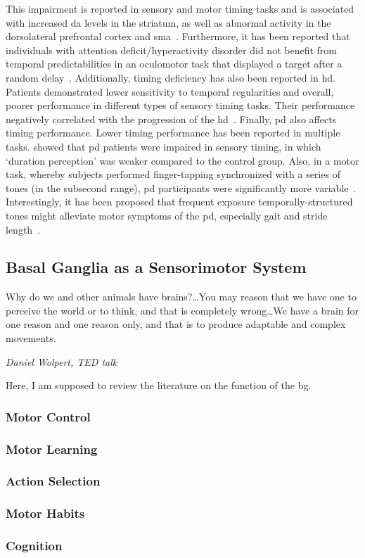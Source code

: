 This impairment is reported in sensory and motor timing tasks and is associated with increased \gls{da} levels in the striatum, as well as abnormal activity in the dorsolateral prefrontal cortex and \gls{sma}~\cite[see][]{Snowden2019}.
Furthermore, it has been reported that individuals with attention deficit/hyperactivity disorder did not benefit from temporal predictabilities in an oculomotor task that displayed a target after a random delay~\cite{Dankner2017}.
Additionally, timing deficiency has also been reported in \gls{hd}.
Patients demonstrated lower sensitivity to temporal regularities and overall, poorer performance in different types of sensory timing tasks.
Their performance negatively correlated with the progression of the \gls{hd}~\cite{Cope2014}.
Finally, \gls{pd} also affects timing performance.
Lower timing performance has been reported in multiple tasks.
 showed that \gls{pd} patients were impaired in sensory timing, in which `duration perception' was weaker compared to the control group.
Also, in a motor task, whereby subjects performed finger-tapping synchronized with a series of tones (in the subsecond range), \gls{pd} participants were significantly more variable~\cite{Harrington1998}.
Interestingly, it has been proposed that frequent exposure temporally-structured tones might alleviate motor symptoms of the \gls{pd}, especially gait and stride length~\cite{Dalla2017}.

\subsection{Basal Ganglia as a Sensorimotor System}
\label{intro:BGMotor}
\epigraph{Why do we and other animals have brains?\ldots You may reason that we have one to perceive the world or to think, and that is completely wrong\ldots We have a brain for one reason and one reason only, and that is to produce adaptable and complex movements.}
{\textit{Daniel Wolpert, TED talk}}
\noindent

Here, I am supposed to review the literature on the function of the \gls{bg}.

\subsubsection{Motor Control} \label{intro:motorControl}
\subsubsection{Motor Learning} \label{intro:motorLearning}
\subsubsection{Action Selection} \label{intro:actionSelection}
\subsubsection{Motor Habits} \label{intro:motorHabits}
\subsubsection{Cognition} \label{intro:bgCognition}
